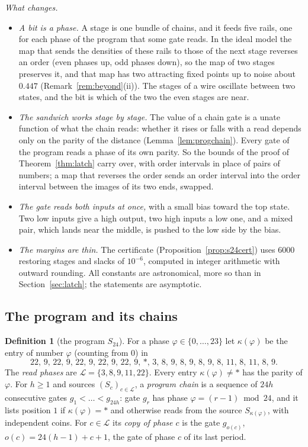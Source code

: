 \documentclass[11pt]{amsart}
\theoremstyle{definition}
\newtheorem{definition}[theorem]{Definition}
\theoremstyle{remark}
\begin{document}
\emph{What changes.}
\begin{itemize}[leftmargin=2em]
\item \emph{A bit is a phase.} A stage is one bundle of chains, and it feeds five rails, one for
each phase of the program that some gate reads. In the ideal model the map that sends the
densities of these rails to those of the next stage reverses an order (even phases up, odd phases
down), so the map of two stages preserves it, and that map has two attracting fixed points up to
noise about $0.447$ (Remark~\ref{rem:beyond}(ii)). The stages of a wire oscillate between two
states, and the bit is which of the two the even stages are near.
\item \emph{The sandwich works stage by stage.} The value of a chain gate is a unate function of
what the chain reads: whether it rises or falls with a read depends only on the parity of the
distance (Lemma~\ref{lem:progchain}). Every gate of the program reads a phase of its own parity.
So the bounds of the proof of Theorem~\ref{thm:latch} carry over, with order intervals in place of
pairs of numbers; a map that reverses the order sends an order interval into the order interval
between the images of its two ends, swapped.
\item \emph{The gate reads both inputs at once,} with a small bias toward the top state. Two low
inputs give a high output, two high inputs a low one, and a mixed pair, which lands near the
middle, is pushed to the low side by the bias.
\item \emph{The margins are thin.} The certificate (Proposition~\ref{prop:s24cert}) uses $6000$
restoring stages and slacks of $10^{-6}$, computed in integer arithmetic with outward rounding. All constants are
astronomical, more so than in Section~\ref{sec:latch}; the statements are asymptotic.
\end{itemize}

\subsection{The program and its chains}

\begin{definition}[the program $S_{24}$]\label{def:s24}
For a phase $\varphi\in\{0,\dots,23\}$ let $\kappa(\varphi)$ be the entry of number $\varphi$
(counting from $0$) in
\[
22,\,9,\,22,\,9,\,22,\,9,\,22,\,9,\,22,\,9,\,\ast,\,3,\,8,\,9,\,8,\,9,\,8,\,9,\,8,\,11,\,8,\,11,\,8,\,9 .
\]
The \emph{read phases} are $\mathcal L=\{3,8,9,11,22\}$. Every entry $\kappa(\varphi)\ne\ast$ has the
parity of $\varphi$. For $h\ge1$ and sources $(S_c)_{c\in\mathcal L}$, a \emph{program chain} is a
sequence of $24h$ consecutive gates $g_1<\dots<g_{24h}$: gate $g_r$ has phase
$\varphi=(r-1)\bmod24$, and it lists position $1$ if $\kappa(\varphi)=\ast$ and otherwise reads
from the source $S_{\kappa(\varphi)}$, with independent coins. For $c\in\mathcal L$ its \emph{copy of
phase $c$} is the gate $g_{o(c)}$, $o(c)=24(h-1)+c+1$, the gate of phase $c$ of its last period.
\end{definition}
\end{document}
